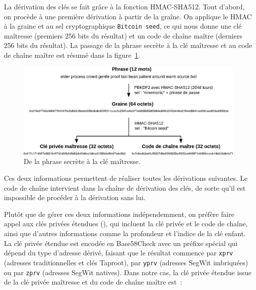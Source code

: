 
La dérivation des clés se fait grâce à la fonction HMAC-SHA512. Tout d'abord, on procède à une première dérivation à partir de la graîne. On applique le HMAC à la graine et au sel cryptographique \texttt{Bitcoin seed}, ce qui nous donne une clé maîtresse (premiers 256 bits du résultat) et un code de chaîne maître (derniers 256 bits du résultat). La passage de la phrase secrète à la clé maîtresse et au code de chaîne maître est résumé dans la figure~\ref{fig:from-mnemonic-to-root}.

\begin{figure}[h]
  \centering
  \includegraphics[scale=0.6]{img/from-mnemonic-to-root.eps}
  \caption{De la phrase secrète à la clé maîtresse.}
  \label{fig:from-mnemonic-to-root}
\end{figure}


Ces deux informations permettent de réaliser toutes les dérivations suivantes. Le code de chaîne intervient dans la chaîne de dérivation des clés, de sorte qu'il est impossible de procéder à la dérivation sans lui.

Plutôt que de gérer ces deux informations indépendemment, on préfère faire appel aux clés privées étendues (), qui incluent la clé privée et le code de chaîne, ainsi que d'autres informations comme la profondeur et l'indice de la clé enfant. La clé privée étendue est encodée en Base58Check avec un préfixe spécial qui dépend du type d'adresse dérivé, faisant que le résultat commence par \texttt{xprv} (adresses traditionnelles et clés Taproot), par \texttt{yprv} (adresses SegWit imbriquées) ou par \texttt{zprv} (adresses SegWit natives). Dans notre cas, la clé privée étendue issue de la clé privée maîtresse et du code de chaîne maître est~:

